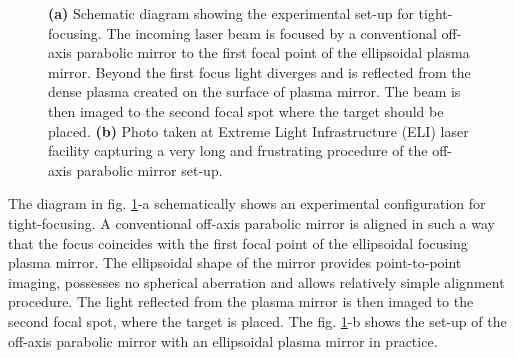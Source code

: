 \begin{figure}[h!]
	\centering
	\hspace{5mm}
	\caption{\textbf{(a)} Schematic diagram showing the experimental set-up for tight-focusing. The incoming laser beam is focused by a conventional off-axis parabolic mirror to the first focal point of the ellipsoidal plasma mirror. Beyond the first focus light diverges and is reflected from the dense plasma created on the surface of plasma mirror. The beam is then imaged to the second focal spot where the target should be placed. \textbf{(b)} Photo taken at Extreme Light Infrastructure (ELI) laser facility capturing a very long and frustrating procedure of the off-axis parabolic mirror set-up.}
	\label{fig:9}
\end{figure}

The diagram in fig. \ref{fig:9}-a schematically shows an experimental configuration for tight-focusing. A conventional off-axis parabolic mirror is aligned in such a way that the focus coincides with the first focal point of the ellipsoidal focusing plasma mirror. The ellipsoidal shape of the mirror provides point-to-point imaging, possesses no spherical aberration and allows relatively simple alignment procedure. The light reflected from the plasma mirror is then imaged to the second focal spot, where the target is placed. The fig. \ref{fig:9}-b shows the set-up of the off-axis parabolic mirror with an ellipsoidal plasma mirror in practice.